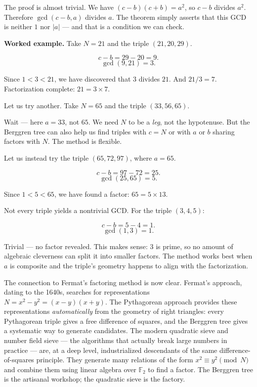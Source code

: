 \documentclass[11pt,twoside,openright]{book}
\theoremstyle{definition}
\theoremstyle{remark}
\begin{document}
The proof is almost trivial. We have $(c - b)(c + b) = a^2$, so $c - b$ divides $a^2$. Therefore $\gcd(c - b, a)$ divides $a$. The theorem simply asserts that this GCD is neither $1$ nor $|a|$ --- and that is a condition we can check.

\textbf{Worked example.} Take $N = 21$ and the triple $(21, 20, 29)$.

\[c - b = 29 - 20 = 9.\]
\[\gcd(9, 21) = 3.\]

Since $1 < 3 < 21$, we have discovered that $3$ divides $21$. And $21 / 3 = 7$. Factorization complete: $21 = 3 \times 7$.

Let us try another. Take $N = 65$ and the triple $(33, 56, 65)$.

Wait --- here $a = 33$, not $65$. We need $N$ to be a \textit{leg}, not the hypotenuse. But the Berggren tree can also help us find triples with $c = N$ or with $a$ or $b$ sharing factors with $N$. The method is flexible.

Let us instead try the triple $(65, 72, 97)$, where $a = 65$.

\[c - b = 97 - 72 = 25.\]
\[\gcd(25, 65) = 5.\]

Since $1 < 5 < 65$, we have found a factor: $65 = 5 \times 13$. 

Not every triple yields a nontrivial GCD. For the triple $(3, 4, 5)$:

\[c - b = 5 - 4 = 1.\]
\[\gcd(1, 3) = 1.\]

Trivial --- no factor revealed. This makes sense: $3$ is prime, so no amount of algebraic cleverness can split it into smaller factors. The method works best when $a$ is composite and the triple's geometry happens to align with the factorization.



The connection to Fermat's factoring method is now clear. Fermat's approach, dating to the 1640s, searches for representations $N = x^2 - y^2 = (x - y)(x + y)$. The Pythagorean approach provides these representations \textit{automatically} from the geometry of right triangles: every Pythagorean triple gives a free difference of squares, and the Berggren tree gives a systematic way to generate candidates. The modern quadratic sieve and number field sieve --- the algorithms that actually break large numbers in practice --- are, at a deep level, industrialized descendants of the same difference-of-squares principle. They generate many relations of the form $x^2 \equiv y^2 \pmod{N}$ and combine them using linear algebra over $\mathbb{F}_2$ to find a factor. The Berggren tree is the artisanal workshop; the quadratic sieve is the factory.
\end{document}
